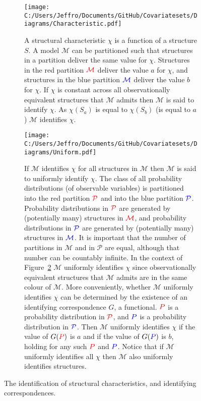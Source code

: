 \documentclass[10pt,a4paper,twoside]{article}
\numberwithin{equation}{section}
\begin{document}
\begin{figure}[p]
\centering
\begin{subfigure}{0.8\textwidth}
  \centering
  \texttt{[image: C:/Users/Jeffro/Documents/GitHub/Covariatesets/Diagrams/Characteristic.pdf]}
  \caption{A structural characteristic $\chi$ is a function of a structure $S$. A model $\mathcal{M}$ can be partitioned such that structures in a partition deliver the same value for $\chi$. Structures in the red partition $\color{red}\mathcal{M}$ deliver the value $a$ for $\chi$, and structures in the blue partition $\color{blue}\mathcal{M}$ deliver the value $b$ for $\chi$. If $\chi$ is constant across all observationally equivalent structures that $\mathcal{M}$ admits then $\mathcal{M}$ is said to identify $\chi$. As $\chi(S_a)$ is equal to $\chi(S_b)$ (is equal to $a$) $\mathcal{M}$ identifies $\chi$.}
  \label{fig:characteristic}
  \end{subfigure}
  \begin{subfigure}{0.8\textwidth}
  \centering
  \texttt{[image: C:/Users/Jeffro/Documents/GitHub/Covariatesets/Diagrams/Uniform.pdf]}
  \caption{If $\mathcal{M}$ identifies $\chi$ for all structures in $\mathcal{M}$ then $\mathcal{M}$ is said to uniformly identify $\chi$. The class of all probability distributions (of observable variables) is partitioned into the red partition $\color{red}\mathcal{P}$ and into the blue partition $\color{blue}\mathcal{P}$. Probability distributions in $\color{red}\mathcal{P}$ are generated by (potentially many) structures in $\color{red}\mathcal{M}$, and probability distributions in $\color{blue}\mathcal{P}$ are generated by (potentially many) structures in $\color{blue}\mathcal{M}$. It is important that the number of partitions in $\mathcal{M}$ and in $\mathcal{P}$ are equal, although that number can be countably infinite. In the context of Figure~\ref{fig:uniform} $\mathcal{M}$ uniformly identifies $\chi$ since observationally equivalent structures that $\mathcal{M}$ admits are in the same colour of $\mathcal{M}$. More conveniently, whether $\mathcal{M}$ uniformly identifies $\chi$ can be determined by the existence of an identifying correspondence $G$, a functional. $\color{red}P$ is a probability distribution in $\color{red}\mathcal{P}$, and $\color{blue}P$ is a probability distribution in $\color{blue}\mathcal{P}$. Then $\mathcal{M}$ uniformly identifies $\chi$ if the value of $G(\color{red}P\color{black})$ is $a$ and if the value of $G(\color{blue}P\color{black})$ is $b$, holding for any such $\color{red}P$ and $\color{blue}P$. Notice that if $\mathcal{M}$ uniformly identifies all $\chi$ then $\mathcal{M}$ also uniformly identifies structures.}
  \label{fig:uniform}
  \end{subfigure}
  \caption{The identification of structural characteristics, and identifying correspondences.}
  \label{fig:characteristics}
\end{figure}
\end{document}
